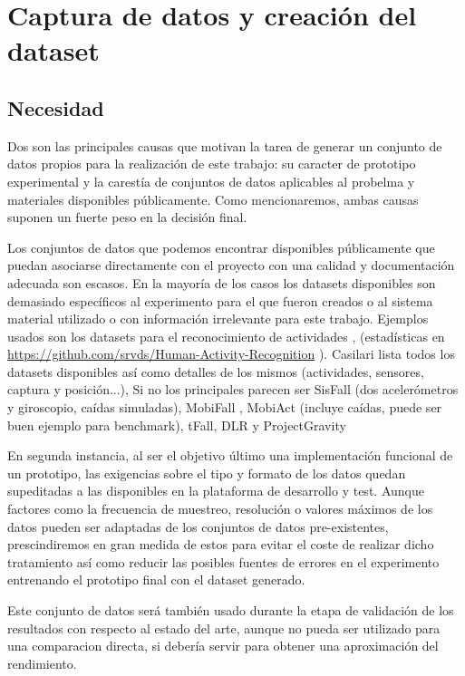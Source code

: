 \documentclass[../tfm.tex]{subfiles}
\begin{document}
\section{Captura de datos y creación del dataset}

\subsection{Necesidad}

Dos son las principales causas que motivan la tarea de generar un conjunto de datos propios para la realización de este trabajo: su caracter de prototipo experimental y la carestía de conjuntos de datos aplicables al probelma y materiales disponibles públicamente. Como mencionaremos, ambas causas suponen un fuerte peso en la decisión final.


Los conjuntos de datos que podemos encontrar disponibles públicamente que puedan asociarse directamente con el proyecto con una calidad y documentación adecuada son escasos. En la mayoría de los casos los datasets disponibles son demasiado específicos al experimento para el que fueron creados o al sistema material utilizado o con información irrelevante para este trabajo. Ejemplos usados son los datasets para el reconocimiento de actividades \cite{UAR2013,UAR2014}, (estadísticas en \url{https://github.com/srvds/Human-Activity-Recognition} ). Casilari \cite{Casilari2020} lista todos los datasets disponibles así como detalles de los mismos (actividades, sensores, captura y posición...), Si no los principales parecen ser SisFall \cite{Sucerquia2017} (dos acelerómetros y giroscopio, caídas simuladas), MobiFall \cite{MobiFall}, MobiAct \cite{MobiAct} (incluye caídas, puede ser buen ejemplo para benchmark), tFall\cite{tfall}, DLR y ProjectGravity \cite{Vilarinho2015}

En segunda instancia, al ser el objetivo último una implementación funcional de un prototipo, las exigencias sobre el tipo y formato de los datos quedan supeditadas a las disponibles en la plataforma de desarrollo y test. Aunque factores como la frecuencia de muestreo, resolución o valores máximos de los datos pueden ser adaptadas de los conjuntos de datos pre-existentes, prescindiremos en gran medida de estos para evitar el coste de realizar dicho tratamiento así como reducir las posibles fuentes de errores en el experimento entrenando el prototipo final con el dataset generado.

Este conjunto de datos será también usado durante la etapa de validación de los resultados con respecto al estado del arte, aunque no pueda ser utilizado para una comparacion directa, si debería servir para obtener una aproximación del rendimiento.
\end{document}
